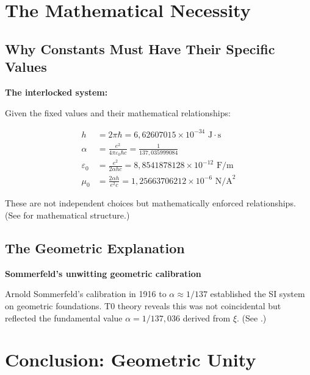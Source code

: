 	\section{The Mathematical Necessity}
	
	\subsection{Why Constants Must Have Their Specific Values}
	
	\begin{derivation}
		\textbf{The interlocked system:}
		
		Given the fixed values and their mathematical relationships:
		
		\begin{align}
			h &= 2\pi\hbar = 6{,}62607015 \times 10^{-34} \text{ J}\cdot\text{s} \\
			\alpha &= \frac{e^2}{4\pi\varepsilon_0\hbar c} = \frac{1}{137{,}035999084} \\
			\varepsilon_0 &= \frac{e^2}{2\alpha h c} = 8{,}8541878128 \times 10^{-12} \text{ F/m} \\
			\mu_0 &= \frac{2\alpha h}{e^2 c} = 1{,}25663706212 \times 10^{-6} \text{ N/A}^2
		\end{align}
		
		These are not independent choices but mathematically enforced relationships. (See \cite{mathematical_structure_En} for mathematical structure.)
	\end{derivation}
	
	\subsection{The Geometric Explanation}
	
	\begin{historical}
		\textbf{Sommerfeld's unwitting geometric calibration}
		
		Arnold Sommerfeld's calibration in 1916 to $\alpha \approx 1/137$ established the SI system on geometric foundations. T0 theory reveals this was not coincidental but reflected the fundamental value $\alpha = 1/137{,}036$ derived from $\xi$. (See \cite{137_En}.)
	\end{historical}
	
		\section{Conclusion: Geometric Unity}
	
